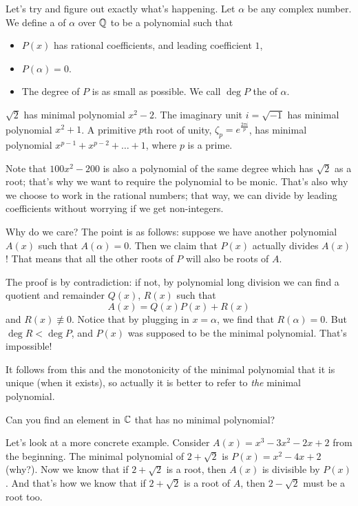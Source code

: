 Let's try and figure out exactly what's happening.
Let $\alpha$ be any complex number.
We define a  of $\alpha$ over $\mathbb Q$ to be a polynomial such that
\begin{itemize}
	\item $P(x)$ has rational coefficients, and leading coefficient $1$,
	\item $P(\alpha) = 0$.
	\item The degree of $P$ is as small as possible.
		We call $\deg P$ the  of $\alpha$.
\end{itemize}
\begin{example}
	\listhack
	\begin{enumerate}[(a)]
	\ii $\sqrt 2$ has minimal polynomial $x^2-2$.
	\ii The imaginary unit $i = \sqrt{-1}$ has minimal polynomial $x^2+1$.
	\ii A primitive $p$th root of unity, $\zeta_p = e^{\frac{2\pi i}{p}}$, has minimal polynomial $x^{p-1} + x^{p-2} + \dots + 1$, where $p$ is a prime.
	\end{enumerate}
\end{example}
Note that $100x^2 - 200$ is also a polynomial of the same degree which has $\sqrt 2$ as a root; that's why we want to require the polynomial to be monic. That's also why we choose to work in the rational numbers; that way, we can divide by leading coefficients without worrying if we get non-integers.

Why do we care? The point is as follows: suppose we have another polynomial $A(x)$ such that $A(\alpha) = 0$.
Then we claim that $P(x)$ actually divides $A(x)$!
That means that all the other roots of $P$ will also be roots of $A$.

The proof is by contradiction: if not, by polynomial long division we can find a quotient and remainder $Q(x)$, $R(x)$ such that
\[ A(x) = Q(x) P(x) + R(x) \]
and $R(x) \not\equiv 0$.
Notice that by plugging in $x = \alpha$, we find that $R(\alpha) = 0$.
But $\deg R < \deg P$, and $P(x)$ was supposed to be the minimal polynomial.
That's impossible!

It follows from this and the monotonicity of the minimal polynomial
that it is unique (when it exists), so actually it is better to refer to
\emph{the} minimal polynomial.
\begin{exercise}
	Can you find an element in $\mathbb C$
	that has no minimal polynomial?
\end{exercise}

Let's look at a more concrete example.
Consider $A(x) = x^3-3x^2-2x+2$ from the beginning.
The minimal polynomial of $2 + \sqrt 2$ is $P(x) = x^2 - 4x + 2$ (why?).
Now we know that if $2 + \sqrt 2$ is a root, then $A(x)$ is divisible by $P(x)$.
And that's how we know that if $2 + \sqrt 2$ is a root of $A$, then $2 - \sqrt 2$ must be a root too.

